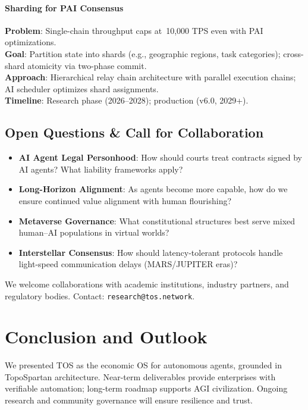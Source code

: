 \documentclass[11pt]{article}
\begin{document}
\paragraph{Sharding for PAI Consensus}
\textbf{Problem}: Single-chain throughput caps at~10,000 TPS even with PAI optimizations.\\
\textbf{Goal}: Partition state into shards (e.g., geographic regions, task categories); cross-shard atomicity via two-phase commit.\\
\textbf{Approach}: Hierarchical relay chain architecture with parallel execution chains; AI scheduler optimizes shard assignments.\\
\textbf{Timeline}: Research phase (2026--2028); production (v6.0, 2029+).

\subsection{Open Questions \& Call for Collaboration}

\begin{itemize}[noitemsep]
  \item \textbf{AI Agent Legal Personhood}: How should courts treat contracts signed by AI agents? What liability frameworks apply?
  \item \textbf{Long-Horizon Alignment}: As agents become more capable, how do we ensure continued value alignment with human flourishing?
  \item \textbf{Metaverse Governance}: What constitutional structures best serve mixed human--AI populations in virtual worlds?
  \item \textbf{Interstellar Consensus}: How should latency-tolerant protocols handle light-speed communication delays (MARS/JUPITER eras)?
\end{itemize}

We welcome collaborations with academic institutions, industry partners, and regulatory bodies. Contact: \texttt{research@tos.network}.

\section{Conclusion and Outlook}
We presented TOS as the economic OS for autonomous agents, grounded in TopoSpartan architecture. Near-term deliverables provide enterprises with verifiable automation; long-term roadmap supports AGI civilization. Ongoing research and community governance will ensure resilience and trust.
\end{document}
